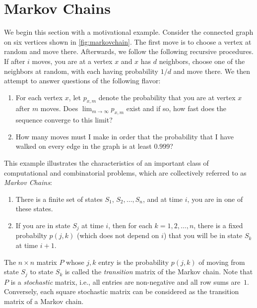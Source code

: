 \section{Markov Chains}

We begin this section with a motivational example.
Consider the connected graph on six
vertices shown in \autoref{fig:markovchain}.
The first move is to choose a vertex at random and move
there.  Afterwards, we follow the following recursive
procedures.  If after $i$ moves, 
you are at a vertex $x$
and $x$ has $d$ neighbors, choose one of the neighbors
at random, with each having probability $1/d$ and move there.
We then attempt to answer questions of the following
flavor:

\begin{enumerate}
\item For each vertex $x$, let $p_{x,m}$ denote
the probability that you are at vertex $x$ after $m$
moves.  Does $\lim_{m\rightarrow\infty}p_{x,m}$ exist and
if so, how fast does the sequence converge to this limit?
\item  How many moves must I make in order that the probability
that I have walked on every edge in the graph is at least
$0.999$?
\end{enumerate}

This example illustrates the characteristics of an important class
of computational and combinatorial problems, which are collectively
referred to as \textit{Markov Chains}:  
\begin{enumerate}
\item There is a finite set of states $S_1$, $S_2,\dots,S_n$, and at
time $i$, you are in one of these states.
\item If you are in state $S_j$ at time $i$, then for each
$k=1,2,\dots,n$, there is a fixed probabilty $p(j,k)$ (which does
not depend on $i$) that you will be in state $S_k$ at time $i+1$.
\end{enumerate}

The $n\times n$ matrix $P$ whose $j,k$ entry is the probability $p(j,k)$ 
of moving from state $S_j$ to state $S_k$ is called the \textit{transition}
matrix of the Markov chain.  Note that $P$ is a \textit{stochastic}
matrix, i.e., all entries are non-negative and all row sums are~$1$.
Conversely, each square stochastic matrix can be considered as the transition 
matrix of a Markov chain.

